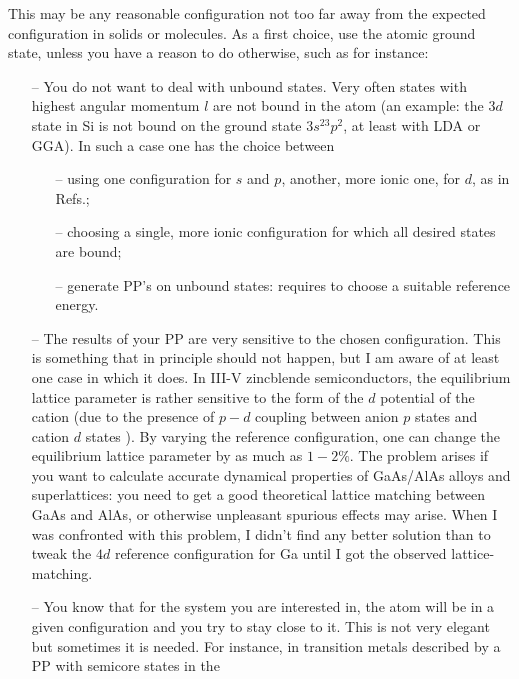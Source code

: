 This may be any reasonable configuration not too far away from
the expected configuration in solids or molecules. As a first
choice, use the atomic ground state, unless you have a reason 
to do otherwise, such as for instance:
\begin{enumerate}
\item[--]
   You do not want to deal with unbound states.
   Very often states with highest angular momentum $l$ are not bound
   in the atom (an example: the $3d$ state in Si is not bound on the
   ground state $3s^23p^2$, at least with LDA or GGA). In such a case 
   one has the choice between 
   \begin{enumerate} 
      \item[--] using one configuration for $s$ and $p$, another, more
                ionic one, for $d$, as in Refs.\cite{BHS,Gonze};
      \item[--] choosing a single, more ionic configuration for which 
                all desired states are bound;
      \item[--] generate PP's on unbound states: requires to choose
                a suitable reference energy.
   \end{enumerate}
\item[--]
   The results of your PP are very sensitive to the chosen configuration.
   This is something that in principle should not happen, but
   I am aware of at least one case in which it does. In III-V
   zincblende semiconductors, the equilibrium lattice parameter
   is rather sensitive to the form of the $d$ potential of the 
   cation (due to the presence of $p-d$ coupling between anion 
   $p$ states and cation $d$ states \cite{Zunger}). By varying
   the reference configuration, one can change the equilibrium 
   lattice parameter by as much as $1-2\%$. 
   The problem arises if you want to calculate accurate dynamical
   properties of GaAs/AlAs alloys and superlattices: you need to
   get a good theoretical lattice matching between GaAs and AlAs,
   or otherwise unpleasant spurious effects may arise. When I was 
   confronted with this problem, I didn't find any better solution
   than to tweak the $4d$ reference configuration for Ga until I got
   the observed lattice-matching.
\item[--]
   You know that for the system you are interested in, the atom will 
   be in a given configuration and you try to stay close to it.
   This is not very elegant but sometimes it is needed. For instance,
   in transition metals described by a PP with semicore states in the 

\end{enumerate}
